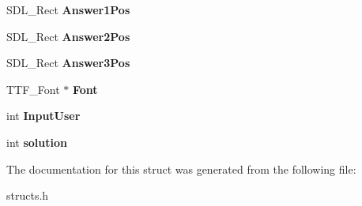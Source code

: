 \begin{DoxyCompactItemize}
\item 
\hypertarget{structenigme_ab3e3e3413abc9d50abe979aeef1796f3}{S\-D\-L\-\_\-\-Rect {\bfseries Answer1\-Pos}}\label{structenigme_ab3e3e3413abc9d50abe979aeef1796f3}

\item 
\hypertarget{structenigme_a96bff1fb1125ff9af077a9d2f221e5b4}{S\-D\-L\-\_\-\-Rect {\bfseries Answer2\-Pos}}\label{structenigme_a96bff1fb1125ff9af077a9d2f221e5b4}

\item 
\hypertarget{structenigme_a990afa591c349a2c4c259b5f53f113f3}{S\-D\-L\-\_\-\-Rect {\bfseries Answer3\-Pos}}\label{structenigme_a990afa591c349a2c4c259b5f53f113f3}

\item 
\hypertarget{structenigme_a0df973941cba497db3764544928f51a4}{T\-T\-F\-\_\-\-Font $\ast$ {\bfseries Font}}\label{structenigme_a0df973941cba497db3764544928f51a4}

\item 
\hypertarget{structenigme_ad17c2d2ef1d838b905397fa32cd1c581}{int {\bfseries Input\-User}}\label{structenigme_ad17c2d2ef1d838b905397fa32cd1c581}

\item 
\hypertarget{structenigme_ae5fd05940e4cdd677b0ce7497f9ff522}{int {\bfseries solution}}\label{structenigme_ae5fd05940e4cdd677b0ce7497f9ff522}

\end{DoxyCompactItemize}


The documentation for this struct was generated from the following file\-:\begin{DoxyCompactItemize}
\item 
structs.\-h\end{DoxyCompactItemize}
